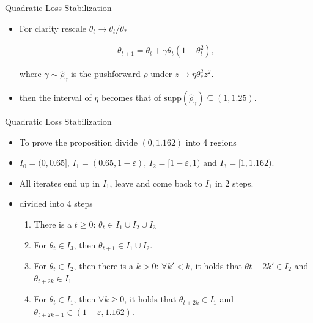 \documentclass[fleqn]{beamer}
\begin{document}
    \begin{frame}{Quadratic Loss Stabilization}
        \begin{itemize}[<+->]
            \item For clarity rescale $\theta_t \to \theta_t/\theta_*$
            \begin{center}
            \begin{minipage}{0.5\textwidth}
                \begin{align*}
                    \theta_{t+1} = \theta_t + \gamma\theta_t\left(
                    1-\theta_t^{2} \right),
                \end{align*}
            \end{minipage}
            \end{center}
            where $\gamma \sim \hat{\rho}_{\gamma}$ is the pushforward
            $\hat{\rho}$ under $z \mapsto \eta\theta_*^{2}z^2$.

        \item then the interval of $\eta$ becomes that of
            $\text{supp}(\hat{\rho}_{\gamma}) \subseteq (1, 1.25)$.
        \end{itemize}
    \end{frame}

    \begin{frame}{Quadratic Loss Stabilization}
        \begin{itemize}[<+->]
            \item To prove the proposition divide $(0, 1.162)$ into 4
                regions
            \item $I_0=(0, 0.65]$, $I_1=(0.65, 1-\varepsilon)$,
                $I_2=[1-\varepsilon, 1)$ and $I_3 = [1, 1.162)$.

            \item All iterates end up in $I_1$, leave and come back to $I_1$
                in 2 steps.

            \item divided into 4 steps
                \begin{enumerate}
                    \item There is a $t\ge 0$: $\theta_t \in I_1\cup
                        I_2\cup I_3$
                    \item For $\theta_t \in I_3$, then $\theta_{t+1} \in I_1
                        \cup I_2$.
                    \item For $\theta_t \in I_2$, then there is a $k>0$:
                        $\forall k' < k$, it holds that $\theta{t+2k'} \in
                        I_2$ and $\theta_{t+2k} \in I_1$
                    \item For $\theta_t \in I_1$, then $\forall k \ge 0$, it
                        holds that
                        $\theta_{t+2k} \in I_1$ and $\theta_{t+2k+1} \in
                        (1+\varepsilon, 1.162)$.
                \end{enumerate}


        \end{itemize}
    \end{frame}
\end{document}
